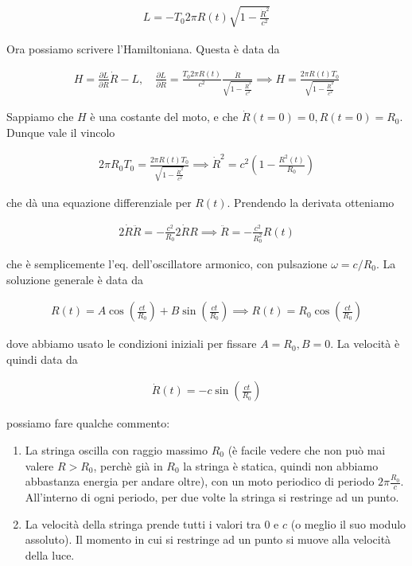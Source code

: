 \documentclass{report}
\begin{document}
\begin{align}
    L = -T_0 2\pi R(t)\sqrt{1-\frac{\dot{R}^2}{c^2}}
\end{align}

Ora possiamo scrivere l'Hamiltoniana. Questa è data da 

\begin{align}
    H = \frac{\partial L}{\partial \dot{R}}\dot{R} - L, \quad \frac{\partial L}{\partial \dot{R}} = \frac{T_0 2\pi R(t)}{c^2}\frac{\dot{R}}{\sqrt{1-\frac{\dot{R}^2}{c^2}}} \implies H = \frac{2\pi R(t)T_0}{\sqrt{1-\frac{\dot{R}^2}{c^2}}} 
\end{align}

Sappiamo che \(H\) è una costante del moto, e che \(\dot{R}(t=0) =0, R(t=0) = R_0\). Dunque vale il vincolo 

\begin{align}
    2\pi R_0 T_0 = \frac{2\pi R(t) T_0}{\sqrt{1-\frac{\dot{R}^2}{c^2}}} \implies \dot{R}^2 = c^2 \left(1-\frac{R^2(t)}{R_0} \right)
\end{align}

che dà una equazione differenziale per \(R(t)\). Prendendo la derivata otteniamo 

\begin{align}
    2\dot{R}\ddot{R} = -\frac{c^2}{R_0}2\dot{R}R \implies \ddot{R} = -\frac{c^2}{R_0^2}R(t)
\end{align}

che è semplicemente l'eq. dell'oscillatore armonico, con pulsazione \(\omega = c/R_0\). La soluzione generale è data da 

\begin{align}
    R(t) = A\cos \left( \frac{ct}{R_0} \right) + B\sin\left( \frac{ct}{R_0} \right) \implies R(t) = R_0 \cos \left( \frac{ct}{R_0} \right)
\end{align}

dove abbiamo usato le condizioni iniziali per fissare \(A = R_0, B= 0\). La velocità è quindi data da 

\begin{align}
    \dot{R}(t) = -c \sin \left( \frac{ct}{R_0} \right)
\end{align}

possiamo fare qualche commento: 

\begin{enumerate}
    \item La stringa oscilla con raggio massimo \(R_0\) (è facile vedere che non può mai valere \(R>R_0\), perchè già in \(R_0\) la stringa è statica, quindi non abbiamo abbastanza energia per andare oltre), con un moto periodico di periodo \(2\pi \frac{R_0}{c}\). All'interno di ogni periodo, per due volte la stringa si restringe ad un punto. 
    \item La velocità della stringa prende tutti i valori tra 0 e \(c\) (o meglio il suo modulo assoluto). Il momento in cui si restringe ad un punto si muove alla velocità della luce. 
\end{enumerate}
\end{document}
